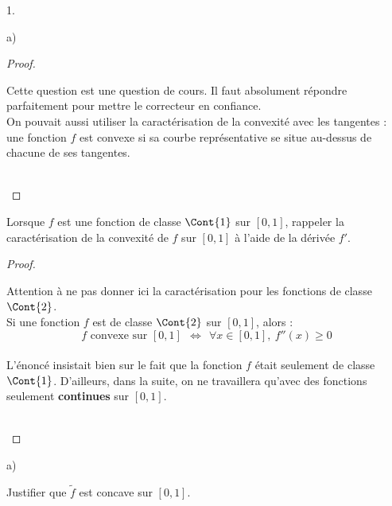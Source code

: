 \documentclass[11pt]{article}%
\begin{document}
\begin{noliste}{1.}
\begin{noliste}{a)}
\begin{proof}
    
    \begin{remark}
      Cette question est une question de cours. Il faut absolument 
      répondre parfaitement pour mettre le correcteur en confiance.\\ 
      On pouvait aussi utiliser la caractérisation de la convexité 
      avec les tangentes :
      une fonction $f$ est convexe si sa courbe représentative se situe 
      au-dessus de chacune de ses tangentes.
    \end{remark}~\\[-1.4cm]
  \end{proof}
  
  
  

  
  \item Lorsque $f$ est une fonction de classe $\Cont{1}$ sur $[0,1]$, 
  rappeler la caractérisation de la convexité de $f$ sur $[0,1]$ à 
  l'aide de la dérivée $f'$.
  
  \begin{proof}~
    
    \begin{remark}
      Attention à ne pas donner ici la caractérisation pour les 
      fonctions de classe $\Cont{2}$. \\
      Si une fonction $f$ est de classe 
      $\Cont{2}$ sur $[0,1]$, alors :~\\[-.4cm]
      \[
        \text{$f$ convexe sur $[0,1]$} \ \ \Leftrightarrow \ \
        \forall x \in [0,1], \ f''(x) \geq 0
      \]~\\[-.6cm]
      L'énoncé insistait bien sur le fait que la fonction $f$ était 
      seulement de classe $\Cont{1}$. D'ailleurs, dans la suite, on ne
      travaillera qu'avec des fonctions seulement {\bf continues} sur 
      $[0,1]$.
    \end{remark}~\\[-1.4cm]
  \end{proof}

 \end{noliste}
 
 \item 
 \begin{noliste}{a)}
  \setlength{\itemsep}{2mm}
  \item Justifier que $\tilde{f}$ est concave sur $[0,1]$.
  

\end{noliste}
\end{noliste}
\end{document}
